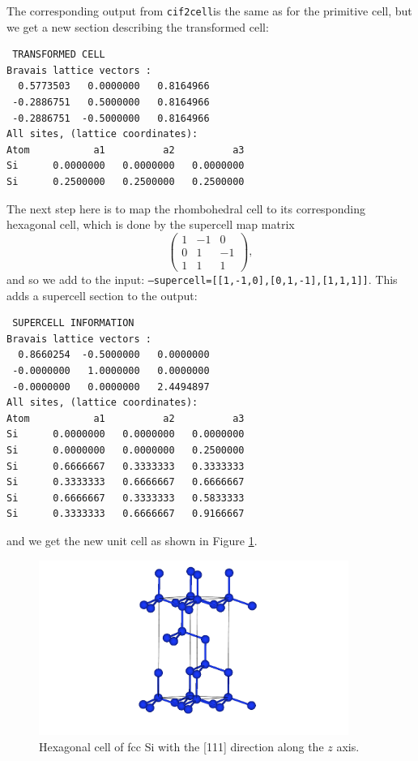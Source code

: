 \documentclass[11pt]{article}
\newcommand{\ciftocell}{\texttt{cif2cell}}
\begin{document}
The corresponding output from \ciftocell is the same as for the primitive cell, but we get a new section describing the transformed cell:
\begin{Verbatim}
 TRANSFORMED CELL
Bravais lattice vectors :
  0.5773503   0.0000000   0.8164966 
 -0.2886751   0.5000000   0.8164966 
 -0.2886751  -0.5000000   0.8164966 
All sites, (lattice coordinates):
Atom           a1          a2          a3 
Si      0.0000000   0.0000000   0.0000000
Si      0.2500000   0.2500000   0.2500000
\end{Verbatim}

The next step here is to map the rhombohedral cell to its corresponding hexagonal cell, which is done by the supercell map matrix
\begin{equation}
\begin{pmatrix}
1 & -1 & 0\\
0 & 1 & -1\\
1 & 1 & 1
\end{pmatrix},
\end{equation}
and so we add to the input: \texttt{--supercell=[[1,-1,0],[0,1,-1],[1,1,1]]}. This adds a supercell section to the output:
\begin{Verbatim}
 SUPERCELL INFORMATION
Bravais lattice vectors :
  0.8660254  -0.5000000   0.0000000 
 -0.0000000   1.0000000   0.0000000 
 -0.0000000   0.0000000   2.4494897 
All sites, (lattice coordinates):
Atom           a1          a2          a3 
Si      0.0000000   0.0000000   0.0000000
Si      0.0000000   0.0000000   0.2500000
Si      0.6666667   0.3333333   0.3333333
Si      0.3333333   0.6666667   0.6666667
Si      0.6666667   0.3333333   0.5833333
Si      0.3333333   0.6666667   0.9166667
\end{Verbatim}
and we get the new unit cell as shown in Figure \ref{hexSi}.

\begin{figure}[htbp] %
   \centering
   \includegraphics[width=0.9\textwidth]{Si_hex.png} 
   \caption{Hexagonal cell of fcc Si with the [111] direction along the $z$ axis.}
   \label{hexSi}
\end{figure}
\end{document}
